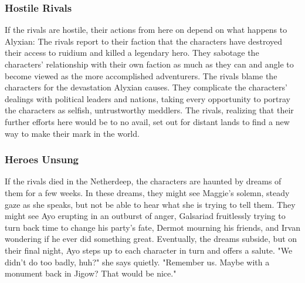 \documentclass[10pt,a4,twoside,twocolumn,openany,nodeprecatedcode]{dndbook}
\begin{document}
\subsubsection{Hostile Rivals}
If the rivals are hostile, their actions from here on depend on what happens to Alyxian:
{{The rivals report to their faction that the characters have destroyed their access to ruidium and killed a legendary hero. They sabotage the characters' relationship with their own faction as much as they can and angle to become viewed as the more accomplished adventurers.}}
{{The rivals blame the characters for the devastation Alyxian causes. They complicate the characters' dealings with political leaders and nations, taking every opportunity to portray the characters as selfish, untrustworthy meddlers.}}
{{The rivals, realizing that their further efforts here would be to no avail, set out for distant lands to find a new way to make their mark in the world.}}
\subsubsection{Heroes Unsung}
If the rivals died in the Netherdeep, the characters are haunted by dreams of them for a few weeks. In these dreams, they might see Maggie's solemn, steady gaze as she speaks, but not be able to hear what she is trying to tell them. They might see Ayo erupting in an outburst of anger, Galsariad fruitlessly trying to turn back time to change his party's fate, Dermot mourning his friends, and Irvan wondering if he ever did something great.
Eventually, the dreams subside, but on their final night, Ayo steps up to each character in turn and offers a salute. "We didn't do too badly, huh?" she says quietly. "Remember us. Maybe with a monument back in Jigow? That would be nice."
\end{document}
